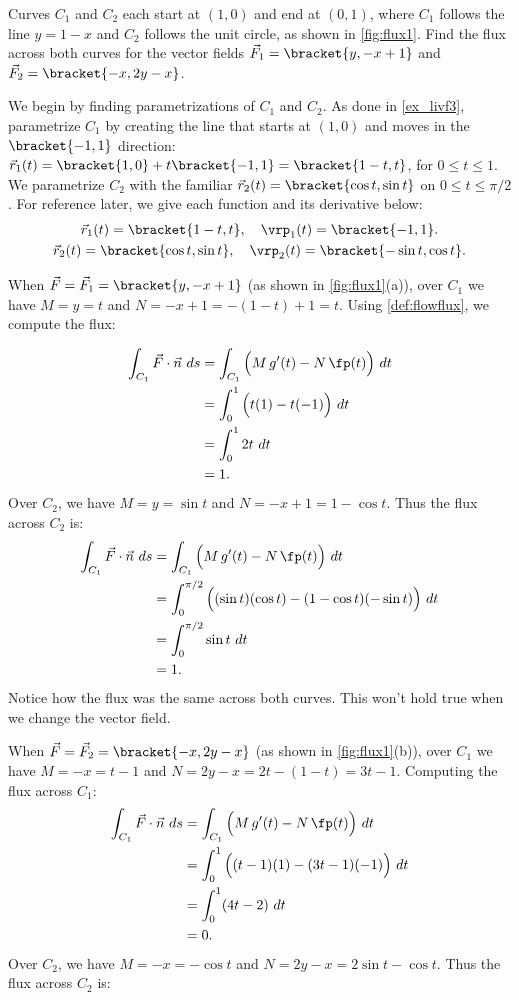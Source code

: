 {Curves $C_1$ and $C_2$ each start at $(1,0)$ and end at $(0,1)$, where $C_1$ follows the line $y=1-x$ and $C_2$ follows the unit circle, as shown in \autoref{fig:flux1}. Find the flux across both curves for the vector fields $\vec F_1 =\bracket{y,-x+1}$ and $\vec F_2 =\bracket{-x,2y-x}$.}
{We begin by finding parametrizations of $C_1$ and $C_2$. As done in \autoref{ex_livf3}, parametrize $C_1$ by creating the line that starts at $(1,0)$ and moves in the $\bracket{-1,1}$ direction: $\vec r_1(t) =\bracket{1,0}+t\bracket{-1,1}=\bracket{1-t,t}$, for $0\leq t\leq 1$. We parametrize $C_2$ with the familiar $\vec r_2(t) =\bracket{\cos t,\sin t}$ on $0\leq t\leq \pi/2$. For reference later, we give each function and its derivative below:
\begin{gather*}
\vec r_1(t) =\bracket{1-t,t},\quad\vrp_1(t)=\bracket{-1,1}.\\
\vec r_2(t) =\bracket{\cos t,\sin t}, \quad \vrp_2(t) =\bracket{-\sin t,\cos t}.
\end{gather*}

When $\vec F = \vec F_1 =\bracket{y,-x+1}$ (as shown in \autoref{fig:flux1}(a)), over $C_1$ we have $M = y =t$ and $N = -x+1 = -(1-t)+1 = t$. Using \autoref{def:flowflux}, we compute the flux:

\begin{align*}
\int_{C_1} \vec F\cdot \vec n\ ds & = \int_{C_1} \Big(M\,g'(t) - N\,\fp(t)\Big)\ dt\\
			&= \int_0^1 \Big( t(1) - t(-1)\Big)\ dt \\
			&= \int_0^1 2t\ dt\\
			&= 1.
\end{align*}
Over $C_2$, we have $M = y = \sin t$ and $N = -x+1 = 1-\cos t$. Thus the flux across $C_2$ is:
\begin{align*}
	\int_{C_1} \vec F\cdot \vec n\ ds
	& = \int_{C_1} \Big(M\,g'(t) - N\,\fp(t)\Big)\ dt\\
	&= \int_0^{\pi/2}\Big((\sin t)(\cos t) - (1-\cos t)(-\sin t)\Big)\ dt\\
	&= \int_0^{\pi/2} \sin t\ dt\\
	&=1.
\end{align*}
Notice how the flux was the same across both curves. This won't hold true when we change the vector field.

When $\vec F=\vec F_2=\bracket{-x,2y-x}$ (as shown in \autoref{fig:flux1}(b)), over $C_1$ we have $M=-x=t-1$ and $N=2y-x=2t-(1-t)=3t-1$. Computing the flux across $C_1$:
\begin{align*}
	\int_{C_1} \vec F\cdot \vec n\ ds
	& = \int_{C_1} \Big(M\,g'(t) - N\,\fp(t)\Big)\ dt\\
	&= \int_0^1 \Big( (t-1)(1) - (3t-1)(-1)\Big)\ dt \\
	&= \int_0^1 (4t-2)\ dt\\
	&= 0.
\end{align*}
Over $C_2$, we have $M = -x = -\cos t$ and $N = 2y-x = 2\sin t-\cos t$. Thus the flux across $C_2$ is:

}
